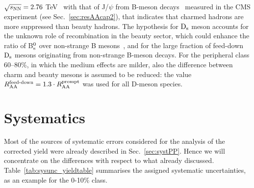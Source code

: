 $\sqrt{s_{\rm NN}} = 2.76$ TeV~\cite{Adam:2015nna} with that of J/$\psi$ from B-meson decays~\cite{Khachatryan:2016ypw} 
measured in the CMS experiment (see Sec.~\ref{sec:resAAcap2}), that indicates that charmed hadrons 
are more suppressed than beauty hadrons. The hypothesis for ${\rm D_s}$ meson
accounts for the unknown role of 
recombination in the beauty sector, which
could enhance the ratio of B$^0_{\rm s}$ over non-strange B mesons~\cite{TAMULHC}, 
and for the large fraction of feed-down ${\rm D_s}$ mesons originating from non-strange B-meson decays.
For the peripheral class 60--80\%, in which the medium effects are milder, 
also the difference between charm and beauty mesons is assumed to be 
reduced: the value $R_{\rm AA}^{\textnormal{feed-down}}=1.3\cdot R_{\rm AA}^{\rm prompt}$ 
was used for all D-meson species. 


\section{Systematics}
\label{sec:systematics}
Most of the sources of systematic errors considered for the analysis 
of the corrected yield were already described in Sec.~\ref{sec:systPP}. 
Hence we will concentrate on the differences with respect to what 
already discussed. Table~\ref{tab:sysunc_yieldtable} summarises the 
assigned systematic uncertainties, as an example for the 0-10\% class. 

